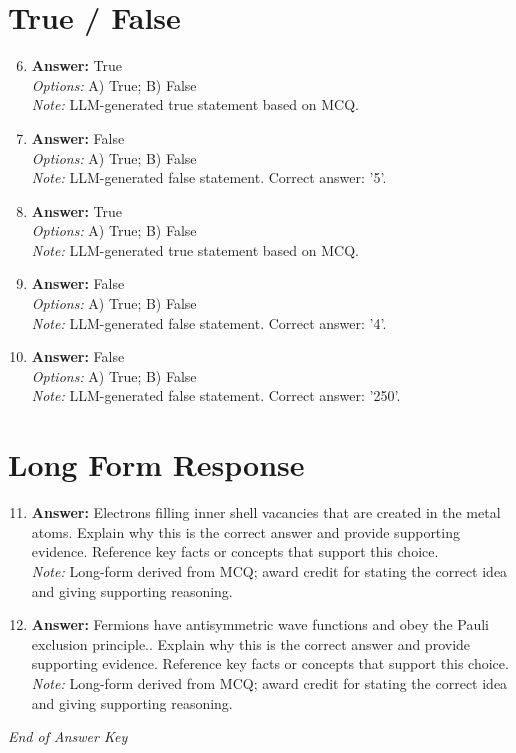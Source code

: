 \documentclass[12pt]{article}
\begin{document}
\section*{True / False}
\begin{enumerate}[label=\arabic*.]
\setcounter{enumi}{5}
\item \textbf{Answer:} True
\\ \textit{Options:} A) True; B) False
\\ \textit{Note:} LLM-generated true statement based on MCQ.
\item \textbf{Answer:} False
\\ \textit{Options:} A) True; B) False
\\ \textit{Note:} LLM-generated false statement. Correct answer: '5'.
\item \textbf{Answer:} True
\\ \textit{Options:} A) True; B) False
\\ \textit{Note:} LLM-generated true statement based on MCQ.
\item \textbf{Answer:} False
\\ \textit{Options:} A) True; B) False
\\ \textit{Note:} LLM-generated false statement. Correct answer: '4'.
\item \textbf{Answer:} False
\\ \textit{Options:} A) True; B) False
\\ \textit{Note:} LLM-generated false statement. Correct answer: '250'.
\end{enumerate}

\section*{Long Form Response}
\begin{enumerate}[label=\arabic*.]
\setcounter{enumi}{10}
\item \textbf{Answer:} Electrons filling inner shell vacancies that are created in the metal atoms. Explain why this is the correct answer and provide supporting evidence. Reference key facts or concepts that support this choice.
\\ \textit{Note:} Long-form derived from MCQ; award credit for stating the correct idea and giving supporting reasoning.
\item \textbf{Answer:} Fermions have antisymmetric wave functions and obey the Pauli exclusion principle.. Explain why this is the correct answer and provide supporting evidence. Reference key facts or concepts that support this choice.
\\ \textit{Note:} Long-form derived from MCQ; award credit for stating the correct idea and giving supporting reasoning.
\end{enumerate}

\vfill
\noindent\textit{End of Answer Key}
\end{document}
